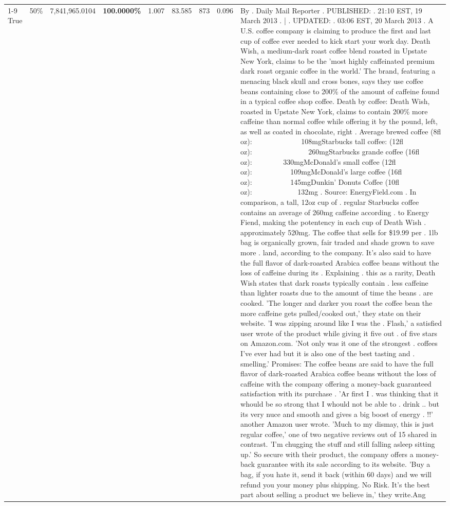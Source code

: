 \begin{table}[H]
{\begin{tabular}{lllrlllll}
\cline{1-9} \cline{2-9}
True & 50\% & 7,841,965.0104 & \bfseries \color{red} 100.0000\% & 1.007 & 83.585 & 873 & 0.096 & By . Daily Mail Reporter . PUBLISHED: . 21:10 EST, 19 March 2013 . | . UPDATED: . 03:06 EST, 20 March 2013 . A U.S. coffee company is claiming to produce the first and last cup of coffee ever needed to kick start your work day. Death Wish, a medium-dark roast coffee blend roasted in Upstate New York, claims to be the 'most highly caffeinated premium dark roast organic coffee in the world.' The brand, featuring a menacing black skull and cross bones, says they use coffee beans containing close to 200\% of the amount of caffeine found in a typical coffee shop coffee. Death by coffee: Death Wish, roasted in Upstate New York, claims to contain 200\% more caffeine than normal coffee while offering it by the pound, left, as well as coated in chocolate, right . Average brewed coffee (8fl oz):              108mgStarbucks tall coffee: (12fl oz):                260mgStarbucks grande coffee (16fl oz):         330mgMcDonald's small coffee (12fl oz):           109mgMcDonald's large coffee (16fl oz):           145mgDunkin' Donuts Coffee (10fl oz):             132mg . Source: EnergyField.com . In comparison, a tall, 12oz cup of . regular Starbucks coffee contains an average of 260mg caffeine according . to Energy Fiend, making the potentency in each cup of Death Wish . approximately 520mg. The coffee that sells for \$19.99 per . 1lb bag is organically grown, fair traded and shade grown to save more . land, according to the company. It's also said to have the full flavor of dark-roasted Arabica coffee beans without the loss of caffeine during its . Explaining . this as a rarity, Death Wish states that dark roasts typically contain . less caffeine than lighter roasts due to the amount of time the beans . are cooked. 'The longer and darker you roast the coffee bean the more caffeine gets pulled/cooked out,' they state on their website. 'I was zipping around like I was the . Flash,' a satisfied user wrote of the product while giving it five out . of five stars on Amazon.com. 'Not only was it one of the strongest . coffees I've ever had but it is also one of the best tasting and . smelling.’ Promises: The coffee beans are said to have the full flavor of dark-roasted Arabica coffee beans without the loss of caffeine with the company offering a money-back guaranteed satisfaction with its purchase . 'Ar first I . was thinking that it whould be so strong that I whould not be able to . drink .. but its very nuce and smooth and gives a big boost of energy . !!' another Amazon user wrote. 'Much to my dismay, this is just regular coffee,' one of two negative reviews out of 15 shared in contrast. 'I'm chugging the stuff and still falling asleep sitting up.' So secure with their product, the company offers a money-back guarantee with its sale according to its website. 'Buy a bag, if you hate it, send it back (within 60 days) and we will refund you your money plus shipping. No Risk. It’s the best part about selling a product we believe in,' they write.Ang \\

\end{tabular}}
\end{table}
